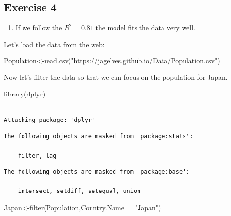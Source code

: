 \documentclass[
  letterpaper,
  DIV=11,
  numbers=noendperiod]{scrreprt}
\newenvironment{Shaded}{\begin{snugshade}}{\end{snugshade}}
\newcommand{\FunctionTok}[1]{\textcolor[rgb]{0.28,0.35,0.67}{#1}}
\newcommand{\NormalTok}[1]{\textcolor[rgb]{0.00,0.23,0.31}{#1}}
\newcommand{\OtherTok}[1]{\textcolor[rgb]{0.00,0.23,0.31}{#1}}
\newcommand{\SpecialCharTok}[1]{\textcolor[rgb]{0.37,0.37,0.37}{#1}}
\newcommand{\StringTok}[1]{\textcolor[rgb]{0.13,0.47,0.30}{#1}}
\providecommand{\tightlist}{%
  \setlength{\itemsep}{0pt}\setlength{\parskip}{0pt}}\usepackage{longtable,booktabs,array}
\begin{document}
\hypertarget{exercise-4-3}{%
\subsection*{Exercise 4}\label{exercise-4-3}}

\begin{blackbox}

\begin{enumerate}
\def\labelenumi{\arabic{enumi}.}
\tightlist
\item
  If we follow the \(R^2=0.81\) the model fits the data very well.
\end{enumerate}

\end{blackbox}

Let's load the data from the web:

\begin{Shaded}
\begin{Highlighting}[numbers=left,,]
\NormalTok{Population}\OtherTok{\textless{}{-}}\FunctionTok{read.csv}\NormalTok{(}\StringTok{"https://jagelves.github.io/Data/Population.csv"}\NormalTok{)}
\end{Highlighting}
\end{Shaded}

Now let's filter the data so that we can focus on the population for
Japan.

\begin{Shaded}
\begin{Highlighting}[numbers=left,,]
\FunctionTok{library}\NormalTok{(dplyr)}
\end{Highlighting}
\end{Shaded}

\begin{verbatim}

Attaching package: 'dplyr'
\end{verbatim}

\begin{verbatim}
The following objects are masked from 'package:stats':

    filter, lag
\end{verbatim}

\begin{verbatim}
The following objects are masked from 'package:base':

    intersect, setdiff, setequal, union
\end{verbatim}

\begin{Shaded}
\begin{Highlighting}[numbers=left,,]
\NormalTok{Japan}\OtherTok{\textless{}{-}}\FunctionTok{filter}\NormalTok{(Population,Country.Name}\SpecialCharTok{==}\StringTok{"Japan"}\NormalTok{)}
\end{Highlighting}
\end{Shaded}
\end{document}
